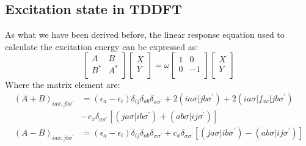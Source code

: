 \subsection{Excitation state in TDDFT}
%
%
%
As what we have been derived before, the linear response equation
used to calculate the excitation energy can be expressed as:
\begin{equation}\label{TDDFTGRADeq:1}
\begin{bmatrix}
  A & B \\
  B^{*} & A^{*} \\
\end{bmatrix}
\begin{bmatrix}
  X \\
  Y \\
\end{bmatrix}
=\omega
\begin{bmatrix}
  1 &  0 \\
  0 & -1 \\
\end{bmatrix}
\begin{bmatrix}
  X \\
  Y \\
\end{bmatrix}
\end{equation}
Where the matrix element are:
\begin{align}\label{}
(A+B)_{ia\sigma, jb\sigma^{'}} &= (\epsilon_{a} -
\epsilon_{i})\delta_{ij}\delta_{ab}\delta_{\sigma\sigma^{'}} +
2(ia\sigma|jb\sigma^{'}) + 2(ia\sigma|f_{xc}|jb\sigma^{'}) \nonumber
\\
& -c_{x}\delta_{\sigma\sigma^{'}}[(ja\sigma|ib\sigma^{'}) +
(ab\sigma|ij\sigma^{'})] \nonumber \\
(A-B)_{ia\sigma, jb\sigma^{'}} &= (\epsilon_{a} -
\epsilon_{i})\delta_{ij}\delta_{ab}\delta_{\sigma\sigma^{'}} +
c_{x}\delta_{\sigma\sigma^{'}}[(ja\sigma|ib\sigma^{'}) -
(ab\sigma|ij\sigma^{'})]
\end{align}

